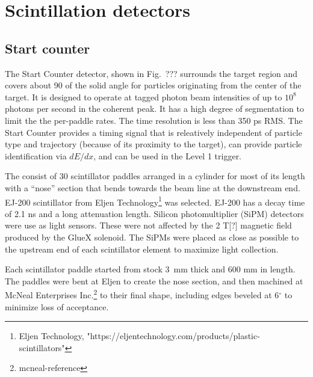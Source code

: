 \section[Scintillation detectors (Mark I./Beni)]{Scintillation detectors \label{sec:scintillators}}
\subsection{Start counter \label{sec:st}}

The Start Counter detector, shown in Fig.\ ??? surrounds the target
region and covers about 90 of the solid angle for particles
originating from the center of the target. It is designed to operate
at tagged photon beam intensities of up to $10^8$ photons per second
in the coherent peak. It has a high degree of segmentation to limit
the the per-paddle rates. The time resolution is less than 350 ps
RMS. The Start Counter provides a timing signal that is releatively
independent of particle type and trajectory (because of its proximity
to the target), can provide particle identification via $dE/dx$, and
can be used in the Level 1 trigger.

The \ST consist of 30 scintillator paddles arranged in a cylinder for most of
its length with a ``nose'' section that bends towards the beam line at
the downstream end. EJ-200 scintillator from Eljen
Technology\footnote{Eljen Technology, "https://eljentechnology.com/products/plastic-scintillators"} was selected. EJ-200 has a decay time
of 2.1 ns and a long attenuation
length. Silicon
photomultiplier (SiPM) detectors were use as light sensors. These were
not affected by the 2 T[?] magnetic field produced by the GlueX
solenoid. The SiPMs were placed as close as possible to the upstream
end of each scintillator element to maximize light collection.

Each scintillator paddle started from stock 3~mm thick and 600 mm in
length. The paddles were bent at Eljen to create the nose section, and
then machined at McNeal Enterprises Inc.\footnote{mcneal-reference} to
their final shape, including edges beveled at 6$^\circ$ to minimize
loss of acceptance.

